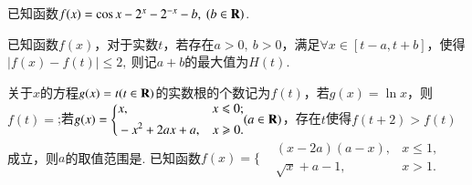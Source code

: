 \documentclass[marginline,noindent,answers,adobefonts]{BHCexam}
\begin{document}
\begin{questions}

\qs 已知函数$f(x)=\cos x-2^x-2^{-x}-b,~(b \in\mathbf{R})$.
\newpage
\qs 已知函数$f(x)$，对于实数$ t $，若存在$ a>0,~b>0$，满足$ \forall x\in [t-a,t+b] $，使得$ \left|f(x)-f(t)\right|\le 2,~ $则记$ a+b $的最大值为$ H(t) .$
\qs 关于$ x $的方程$ g(x)=t(t\in\mathbf{R}) $的实数根的个数记为$ f(t) $，若$g(x)=\ln x$，则$f(t)=$\tk;若$g(x)=\Bigg\{\begin{aligned}
&x,&x\leqslant0;\\
&-x^2+2ax+a,&x\geqslant0.
\end{aligned}(a\in\mathbf{R})$，存在$ t $使得$ f(t+2)>f(t) $成立，则$ a $的取值范围是\tk.
\qs 已知函数$f(x)=\Bigg\{\begin{aligned}
&(x-2a)(a-x),&x\le 1,\\&\sqrt{x}+a-1,&x>1.
\end{aligned}$\\
\end{questions}
\end{document}
